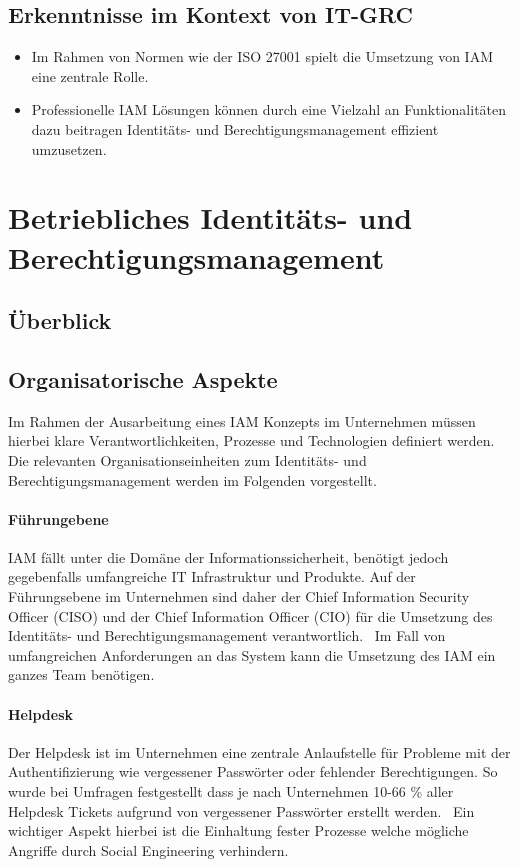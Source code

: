 \documentclass[12pt]{article}
\begin{document}
\subsection{Erkenntnisse im Kontext von IT-GRC}
\begin{itemize}
  \item Im Rahmen von Normen wie der ISO 27001 spielt die Umsetzung von IAM eine zentrale Rolle.
  \item Professionelle IAM Lösungen können durch eine Vielzahl an Funktionalitäten dazu beitragen Identitäts- und Berechtigungsmanagement effizient umzusetzen.
\end{itemize}
\section{Betriebliches Identitäts- und Berechtigungsmanagement}
\label{sec:betrieb}
\subsection{Überblick}
\subsection{Organisatorische Aspekte}
Im Rahmen der Ausarbeitung eines IAM Konzepts im Unternehmen müssen hierbei klare Verantwortlichkeiten, Prozesse und Technologien definiert werden. Die relevanten Organisationseinheiten zum Identitäts- und Berechtigungsmanagement werden im Folgenden vorgestellt.
\paragraph{Führungebene}
IAM fällt unter die Domäne der Informationssicherheit, benötigt jedoch gegebenfalls umfangreiche IT Infrastruktur und Produkte. Auf der Führungsebene im Unternehmen sind daher der Chief Information Security Officer (CISO) und der Chief Information Officer (CIO) für die Umsetzung des Identitäts- und Berechtigungsmanagement verantwortlich.~\cite{azhar2014economics}\cite{baldwin2009using} Im Fall von umfangreichen Anforderungen an das System kann die Umsetzung des IAM ein ganzes Team benötigen.~\cite{mohammed2011identity}
\paragraph{Helpdesk}
Der Helpdesk ist im Unternehmen eine zentrale Anlaufstelle für Probleme mit der Authentifizierung wie vergessener Passwörter oder fehlender Berechtigungen. So wurde bei Umfragen festgestellt dass je nach Unternehmen 10-66 \% aller Helpdesk Tickets aufgrund von vergessener Passwörter erstellt werden.~\cite{ylen2004centralized}\cite{tsolkas2017} Ein wichtiger Aspekt hierbei ist die Einhaltung fester Prozesse welche mögliche Angriffe durch Social Engineering verhindern.~\cite{wood2005implementing}
\end{document}
